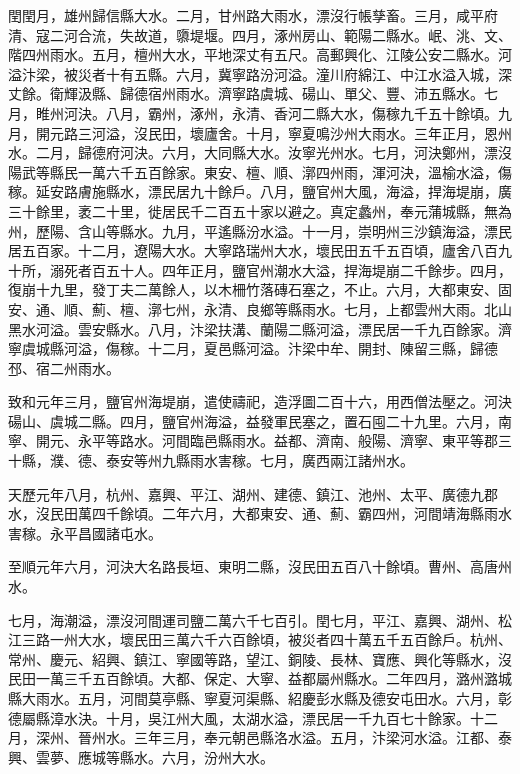 \begin{pinyinscope}
 閏閏月，雄州歸信縣大水。二月，甘州路大雨水，漂沒行帳孳畜。三月，咸平府清、寇二河合流，失故道，隳堤堰。四月，涿州房山、範陽二縣水。岷、洮、文、階四州雨水。五月，檀州大水，平地深丈有五尺。高郵興化、江陵公安二縣水。河溢汴梁，被災者十有五縣。六月，冀寧路汾河溢。潼川府綿江、中江水溢入城，深丈餘。衛輝汲縣、歸德宿州雨水。濟寧路虞城、碭山、單父、豐、沛五縣水。七月，睢州河決。八月，霸州，涿州，永清、香河二縣大水，傷稼九千五十餘頃。九月，開元路三河溢，沒民田，壞廬舍。十月，寧夏鳴沙州大雨水。三年正月，恩州水。二月，歸德府河決。六月，大同縣大水。汝寧光州水。七月，河決鄭州，漂沒陽武等縣民一萬六千五百餘家。東安、檀、順、漷四州雨，渾河決，溫榆水溢，傷稼。延安路膚施縣水，漂民居九十餘戶。八月，鹽官州大風，海溢，捍海堤崩，廣三十餘里，袤二十里，徙居民千二百五十家以避之。真定蠡州，奉元蒲城縣，無為州，歷陽、含山等縣水。九月，平遙縣汾水溢。十一月，崇明州三沙鎮海溢，漂民居五百家。十二月，遼陽大水。大寧路瑞州大水，壞民田五千五百頃，廬舍八百九十所，溺死者百五十人。四年正月，鹽官州潮水大溢，捍海堤崩二千餘步。四月，復崩十九里，發丁夫二萬餘人，以木柵竹落磚石塞之，不止。六月，大都東安、固安、通、順、薊、檀、漷七州，永清、良鄉等縣雨水。七月，上都雲州大雨。北山黑水河溢。雲安縣水。八月，汴梁扶溝、蘭陽二縣河溢，漂民居一千九百餘家。濟寧虞城縣河溢，傷稼。十二月，夏邑縣河溢。汴梁中牟、開封、陳留三縣，歸德邳、宿二州雨水。



 致和元年三月，鹽官州海堤崩，遣使禱祀，造浮圖二百十六，用西僧法壓之。河決碭山、虞城二縣。四月，鹽官州海溢，益發軍民塞之，置石囤二十九里。六月，南寧、開元、永平等路水。河間臨邑縣雨水。益都、濟南、般陽、濟寧、東平等郡三十縣，濮、德、泰安等州九縣雨水害稼。七月，廣西兩江諸州水。



 天歷元年八月，杭州、嘉興、平江、湖州、建德、鎮江、池州、太平、廣德九郡水，沒民田萬四千餘頃。二年六月，大都東安、通、薊、霸四州，河間靖海縣雨水害稼。永平昌國諸屯水。



 至順元年六月，河決大名路長垣、東明二縣，沒民田五百八十餘頃。曹州、高唐州水。



 七月，海潮溢，漂沒河間運司鹽二萬六千七百引。閏七月，平江、嘉興、湖州、松江三路一州大水，壞民田三萬六千六百餘頃，被災者四十萬五千五百餘戶。杭州、常州、慶元、紹興、鎮江、寧國等路，望江、銅陵、長林、寶應、興化等縣水，沒民田一萬三千五百餘頃。大都、保定、大寧、益都屬州縣水。二年四月，潞州潞城縣大雨水。五月，河間莫亭縣、寧夏河渠縣、紹慶彭水縣及德安屯田水。六月，彰德屬縣漳水決。十月，吳江州大風，太湖水溢，漂民居一千九百七十餘家。十二月，深州、晉州水。三年三月，奉元朝邑縣洛水溢。五月，汴梁河水溢。江都、泰興、雲夢、應城等縣水。六月，汾州大水。




\end{pinyinscope}
